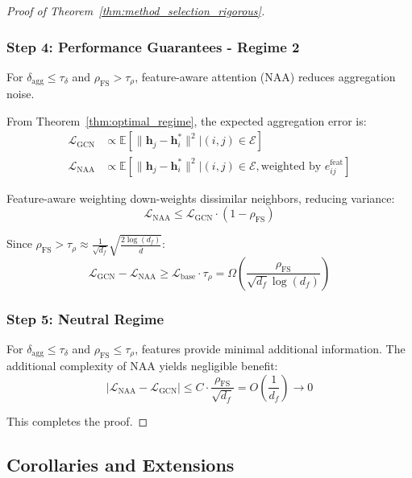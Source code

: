 \begin{proof}[Proof of Theorem~\ref{thm:method_selection_rigorous}]
\subsubsection*{Step 4: Performance Guarantees - Regime 2}

For $\delta_{\text{agg}} \leq \tau_\delta$ and $\rho_{\text{FS}} > \tau_\rho$, feature-aware attention (NAA) reduces aggregation noise.

From Theorem~\ref{thm:optimal_regime}, the expected aggregation error is:
\begin{align}
\mathcal{L}_{\text{GCN}} &\propto \mathbb{E}[\|\mathbf{h}_j - \mathbf{h}_i^*\|^2 | (i,j) \in \mathcal{E}] \\
\mathcal{L}_{\text{NAA}} &\propto \mathbb{E}[\|\mathbf{h}_j - \mathbf{h}_i^*\|^2 | (i,j) \in \mathcal{E}, \text{weighted by } e_{ij}^{\text{feat}}]
\end{align}

Feature-aware weighting down-weights dissimilar neighbors, reducing variance:
\begin{equation}
\mathcal{L}_{\text{NAA}} \leq \mathcal{L}_{\text{GCN}} \cdot (1 - \rho_{\text{FS}})
\end{equation}

Since $\rho_{\text{FS}} > \tau_\rho \approx \frac{1}{\sqrt{d_f}}\sqrt{\frac{2\log(d_f)}{\bar{d}}}$:
\begin{equation}
\mathcal{L}_{\text{GCN}} - \mathcal{L}_{\text{NAA}} \geq \mathcal{L}_{\text{base}} \cdot \tau_\rho = \Omega\left(\frac{\rho_{\text{FS}}}{\sqrt{d_f}\log(d_f)}\right)
\end{equation}

\subsubsection*{Step 5: Neutral Regime}

For $\delta_{\text{agg}} \leq \tau_\delta$ and $\rho_{\text{FS}} \leq \tau_\rho$, features provide minimal additional information. The additional complexity of NAA yields negligible benefit:
\begin{equation}
|\mathcal{L}_{\text{NAA}} - \mathcal{L}_{\text{GCN}}| \leq C \cdot \frac{\rho_{\text{FS}}}{\sqrt{d_f}} = O\left(\frac{1}{d_f}\right) \to 0
\end{equation}

This completes the proof.
\end{proof}

\subsection{Corollaries and Extensions}

